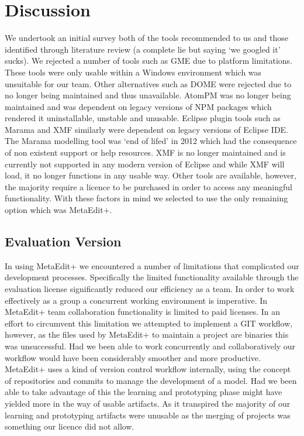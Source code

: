 \section{Discussion}
We undertook an initial survey both of the tools recommended to us and those identified through literature review (a complete lie but saying ‘we googled it’ sucks). 
We rejected a number of tools such as GME due to platform limitations. These tools were only usable within a Windows environment which was unsuitable for our team. Other alternatives such as DOME were rejected due to no longer being maintained and thus unavailable. AtomPM was no longer being maintained and was dependent on legacy versions of NPM packages which rendered it uninstallable, unstable and unusable. Eclipse plugin tools such as Marama and XMF similarly were dependent on legacy versions of Eclipse IDE. The Marama modelling tool was ‘end of lifed’ in 2012 which had the consequence of non existent support or help resources. XMF is no longer maintained and is currently not supported in any modern version of Eclipse and while XMF will load, it no longer functions in any usable way. 
Other tools are available, however, the majority require a licence to be purchased in order to access any meaningful functionality. With these factors in mind we selected to use the only remaining option which was MetaEdit+.

\subsection{Evaluation Version}
In using MetaEdit+ we encountered a number of limitations that complicated our development processes. Specifically the limited functionality available through the evaluation license significantly reduced our efficiency as a team. In order to work effectively as a group a concurrent working environment is imperative. In MetaEdit+ team collaboration functionality is limited to paid licenses. In an effort to circumvent this limitation we attempted to implement a GIT workflow, however, as the files used by MetaEdit+ to maintain a project are binaries this was unsuccessful. Had we been able to work concurrently and collaboratively our workflow would have been considerably smoother and more productive. MetaEdit+ uses a kind of version control workflow internally, using the concept of repositories and commits to manage the development of a model. Had we been able to take advantage of this the learning and prototyping phase might have yielded more in the way of usable artifacts. As it transpired the majority of our learning and prototyping artifacts were unusable as the merging of projects was something our licence did not allow.